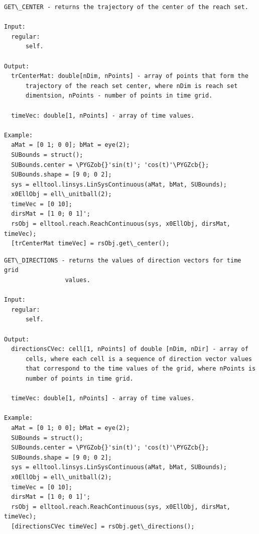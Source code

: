 \documentclass[letterpaper,10pt,english]{sphinxmanual}
\def\PYGZob{\char`\{}
\def\PYGZcb{\char`\}}
\begin{document}
\label{chap_func:elltool-reach-areach-get-center}
\begin{Verbatim}[commandchars=\\\{\}]
GET\_CENTER - returns the trajectory of the center of the reach set.

Input:
  regular:
      self.

Output:
  trCenterMat: double[nDim, nPoints] - array of points that form the
      trajectory of the reach set center, where nDim is reach set
      dimentsion, nPoints - number of points in time grid.

  timeVec: double[1, nPoints] - array of time values.

Example:
  aMat = [0 1; 0 0]; bMat = eye(2);
  SUBounds = struct();
  SUBounds.center = \PYGZob{}'sin(t)'; 'cos(t)'\PYGZcb{};
  SUBounds.shape = [9 0; 0 2];
  sys = elltool.linsys.LinSysContinuous(aMat, bMat, SUBounds);
  x0EllObj = ell\_unitball(2);
  timeVec = [0 10];
  dirsMat = [1 0; 0 1]';
  rsObj = elltool.reach.ReachContinuous(sys, x0EllObj, dirsMat, timeVec);
  [trCenterMat timeVec] = rsObj.get\_center();
\end{Verbatim}
\label{chap_func:elltool-reach-areach-get-directions}
\begin{Verbatim}[commandchars=\\\{\}]
GET\_DIRECTIONS - returns the values of direction vectors for time grid
                 values.

Input:
  regular:
      self.

Output:
  directionsCVec: cell[1, nPoints] of double [nDim, nDir] - array of
      cells, where each cell is a sequence of direction vector values
      that correspond to the time values of the grid, where nPoints is
      number of points in time grid.

  timeVec: double[1, nPoints] - array of time values.

Example:
  aMat = [0 1; 0 0]; bMat = eye(2);
  SUBounds = struct();
  SUBounds.center = \PYGZob{}'sin(t)'; 'cos(t)'\PYGZcb{};
  SUBounds.shape = [9 0; 0 2];
  sys = elltool.linsys.LinSysContinuous(aMat, bMat, SUBounds);
  x0EllObj = ell\_unitball(2);
  timeVec = [0 10];
  dirsMat = [1 0; 0 1]';
  rsObj = elltool.reach.ReachContinuous(sys, x0EllObj, dirsMat, timeVec);
  [directionsCVec timeVec] = rsObj.get\_directions();
\end{Verbatim}
\label{chap_func:elltool-reach-areach-get-ea}
\end{document}
